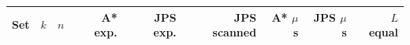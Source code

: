 \begin{tabular}{lr r rr r rr r}\toprule
Set & $k$ & $n$ & A* exp. & JPS exp. & JPS scanned & A* $\mu$s & JPS $\mu$s & $L$ equal\\\midrule
\bottomrule\end{tabular}
